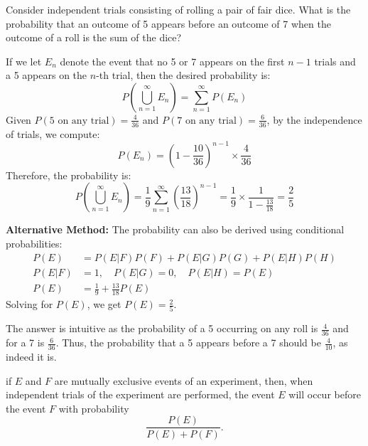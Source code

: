 \begin{example}
    Consider independent trials consisting of rolling a pair of fair dice. What is the probability that an outcome of 5 appears before an outcome of 7 when the outcome of a roll is the sum of the dice?
\end{example}
\begin{solution}
    If we let \( E_n \) denote the event that no 5 or 7 appears on the first \( n-1 \) trials and a 5 appears on the \( n \)-th trial, then the desired probability is:
    \[
    P\left( \bigcup_{n=1}^\infty E_n \right) = \sum_{n=1}^\infty P(E_n)
    \]
    Given \( P(5 \text{ on any trial}) = \frac{4}{36} \) and \( P(7 \text{ on any trial}) = \frac{6}{36} \), by the independence of trials, we compute:
    \[
    P(E_n) = \left(1 - \frac{10}{36}\right)^{n-1} \times \frac{4}{36}
    \]
    Therefore, the probability is:
    \[
    P\left( \bigcup_{n=1}^\infty E_n \right) = \frac{1}{9} \sum_{n=1}^\infty \left(\frac{13}{18}\right)^{n-1} = \frac{1}{9} \times \frac{1}{1 - \frac{13}{18}} = \frac{2}{5}
    \]
    
    \textbf{Alternative Method:}
    The probability can also be derived using conditional probabilities:
    \begin{align*}
    P(E) &= P(E|F)P(F) + P(E|G)P(G) + P(E|H)P(H) \\
    P(E|F) &= 1, \quad P(E|G) = 0, \quad P(E|H) = P(E) \\
    P(E) &= \frac{1}{9} + \frac{13}{18} P(E)
    \end{align*}
    Solving for \( P(E) \), we get \( P(E) = \frac{2}{5} \).
    \end{solution}
    \begin{remark}
        The answer is intuitive as the probability of a 5 occurring on any roll is \( \frac{4}{36} \) and for a 7 is \( \frac{6}{36} \). Thus, the probability that a 5 appears before a 7 should be \( \frac{4}{10} \), as indeed it is.

        if $E$ and $F$ are mutually exclusive events of an
        experiment, then, when independent trials of the experiment are performed, the
        event $E$ will occur before the event $F$ with probability
        \[\frac{P(E)}{P(E)+P(F)}.\]
    \end{remark}
